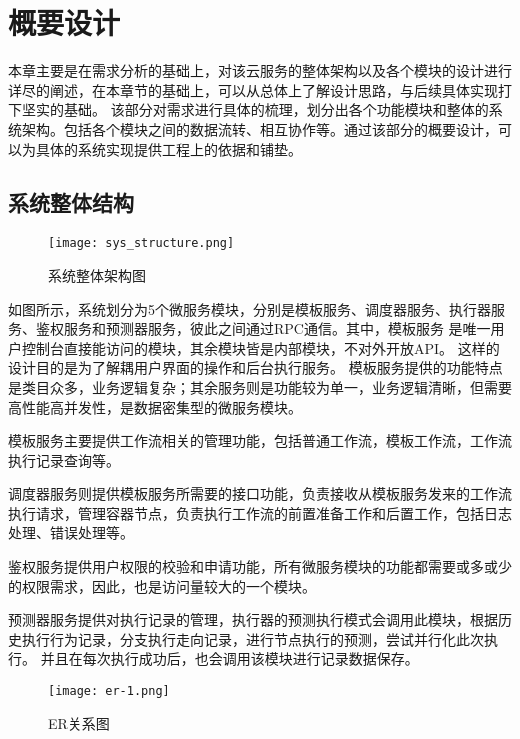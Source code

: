 
\chapter{概要设计}
本章主要是在需求分析的基础上，对该云服务的整体架构以及各个模块的设计进行详尽的阐述，在本章节的基础上，可以从总体上了解设计思路，与后续具体实现打下坚实的基础。
该部分对需求进行具体的梳理，划分出各个功能模块和整体的系统架构。包括各个模块之间的数据流转、相互协作等。通过该部分的概要设计，可以为具体的系统实现提供工程上的依据和铺垫。


\section{系统整体结构}

\begin{figure}[H]
    \centering
    \texttt{[image: sys\_structure.png]}
    \caption{系统整体架构图}
    \label{fig:系统整体架构图}
    \note{}
\end{figure}

如图所示，系统划分为5个微服务模块，分别是模板服务、调度器服务、执行器服务、鉴权服务和预测器服务，彼此之间通过RPC通信。其中，模板服务
是唯一用户控制台直接能访问的模块，其余模块皆是内部模块，不对外开放API。 这样的设计目的是为了解耦用户界面的操作和后台执行服务。
模板服务提供的功能特点是类目众多，业务逻辑复杂；其余服务则是功能较为单一，业务逻辑清晰，但需要高性能高并发性，是数据密集型的微服务模块。

模板服务主要提供工作流相关的管理功能，包括普通工作流，模板工作流，工作流执行记录查询等。

调度器服务则提供模板服务所需要的接口功能，负责接收从模板服务发来的工作流执行请求，管理容器节点，负责执行工作流的前置准备工作和后置工作，包括日志处理、错误处理等。

鉴权服务提供用户权限的校验和申请功能，所有微服务模块的功能都需要或多或少的权限需求，因此，也是访问量较大的一个模块。

预测器服务提供对执行记录的管理，执行器的预测执行模式会调用此模块，根据历史执行行为记录，分支执行走向记录，进行节点执行的预测，尝试并行化此次执行。
并且在每次执行成功后，也会调用该模块进行记录数据保存。


\begin{figure}[H]
    \centering
    \texttt{[image: er-1.png]}
    \caption{ER关系图}
    \label{fig:ER关系图}
    \note{}
\end{figure}

